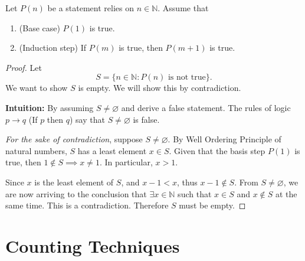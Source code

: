 \begin{theorem}
    Let $P(n)$ be a statement relies on $n \in \mathbb{N}$. Assume that
    \begin{enumerate}
    \item (Base case) $P(1)$ is true.
    \item (Induction step) If $P(m)$ is true, then $P(m+1)$ is true.
    \end{enumerate}
\end{theorem}
\begin{proof}
    Let 
    \[
        S = \{ n \in \mathbb{N} : P(n) \text{ is not true} \}.
    \]
    We want to show $S$ is empty. We will show this by contradiction.

    \textbf{Intuition:} By assuming $S \neq \varnothing$ and derive a false 
    statement. The rules of logic $p \rightarrow q$ (If $p$ then $q$) say that $S \neq \varnothing$ is false.

    \textit{For the sake of contradiction}, suppose $S \neq \varnothing$. By Well Ordering Principle of 
    natural numbers, $S$ has a least element $x \in S$. Given that the basis step $P(1)$ is true, 
    then $1 \notin S \implies x \neq 1$. In particular, $x > 1$.

    Since $x$ is the least element of $S$, and $x - 1 < x$, thus $x -1 \notin S$. From $S \neq \varnothing$, 
    we are now arriving to the conclusion that $\exists x \in \mathbb{N}$ such that $x \in S$ and $x \notin S$ 
    at the same time. This is a contradiction. Therefore $S$ must be empty.
\end{proof}


\section{Counting Techniques}

